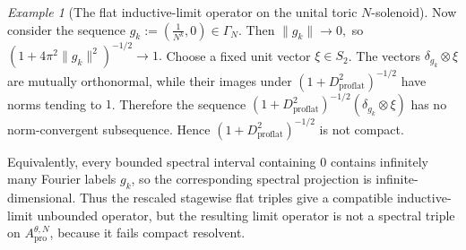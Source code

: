 \documentclass[11pt]{amsart}
\theoremstyle{definition}
\theoremstyle{remark}
\newtheorem{example}[theorem]{Example}
\newcommand{\ex}{\mathrm{pro}}
\begin{document}
\begin{example}[The flat inductive-limit operator on the unital toric $N$-solenoid]
Now consider the sequence $g_k:=\left(\frac{1}{N^k},0\right)\in\Gamma_N.$
Then $\|g_k\|\to 0,$
so $(1+4\pi^2\|g_k\|^2)^{-1/2}\to 1.$
Choose a fixed unit vector $\xi\in S_2$. The vectors $\delta_{g_k}\otimes\xi$
are mutually orthonormal, while their images under
$(1+D_{\mathrm{proflat}}^2)^{-1/2}$ have norms tending to $1$. Therefore the
sequence $(1+D_{\mathrm{proflat}}^2)^{-1/2}(\delta_{g_k}\otimes\xi)$
has no norm-convergent subsequence. Hence $(1+D_{\mathrm{proflat}}^2)^{-1/2}$
is not compact.

Equivalently, every bounded spectral interval containing $0$ contains
infinitely many Fourier labels $g_k$, so the corresponding spectral
projection is infinite-dimensional. Thus the rescaled stagewise flat triples give a compatible inductive-limit
unbounded operator, but the resulting limit operator is not a spectral triple
on $A_{\ex}^{\theta,N}$, because it fails compact resolvent.
\end{example}
\end{document}
